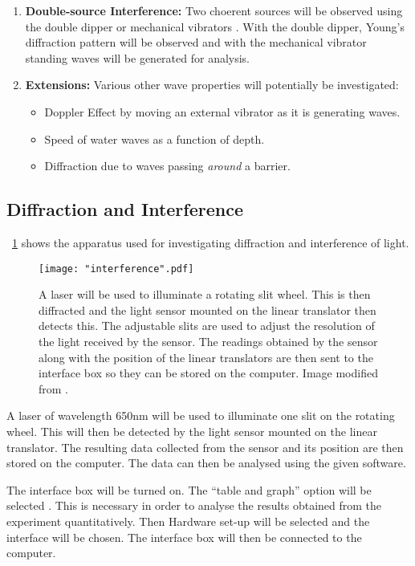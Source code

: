 \documentclass{article}
\newcommand{\figref}[2][\figurename~]{#1\ref{#2}}
\begin{document}
\begin{enumerate}
  \item \textbf{Double-source Interference:} Two choerent sources will be observed using the double dipper or mechanical vibrators \cite{Paper01}. With the double dipper, Young's diffraction pattern will be observed and with the mechanical vibrator standing waves will be generated for analysis.
  \item \textbf{Extensions:} Various other wave properties will potentially be investigated:
  	\begin{itemize}
     \item Doppler Effect by moving an external vibrator as it is generating waves.
     \item Speed of water waves as a function of depth.
     \item Diffraction due to waves passing \textit{around} a barrier.
   \end{itemize}
\end{enumerate}

\subsection{Diffraction and Interference}
\label{ssec:diffraction-method}

\figref{fig:interference} shows the apparatus used for investigating diffraction and interference of light.

\begin{figure}[h]
\centering
\texttt{[image: "interference".pdf]}
\caption{A laser will be used to illuminate a rotating slit wheel. This is then diffracted and the light sensor mounted on the linear translator then detects this. The adjustable slits are used to adjust the resolution of the light received by the sensor. The readings obtained by the sensor along with the position of the linear translators are then sent to the interface box so they can be stored on the computer. Image modified from \cite{Paper02}.}
\label{fig:interference}
\end{figure}

\vspace{2mm}
\noindent
A laser of wavelength 650nm will be used to illuminate one slit on the rotating wheel. This will then be detected by the light sensor mounted on the linear translator. The resulting data collected from the sensor and its position are then stored on the computer. The data can then be analysed using the given software. 

\vspace{2mm}
\noindent
The interface box will be turned on. The ``table and graph'' option will be selected \cite{Paper02}. This is necessary in order to analyse the results obtained from the experiment quantitatively. Then Hardware set-up will be selected and the interface will be chosen. The interface box will then be connected to the computer.
\end{document}

